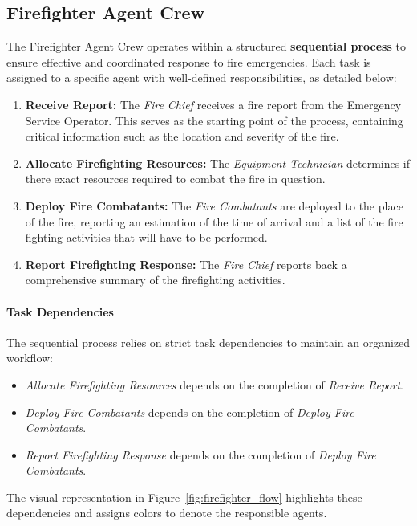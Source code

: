 \subsection{Firefighter Agent Crew}

The Firefighter Agent Crew operates within a structured \textbf{sequential process} to ensure effective and coordinated response to fire emergencies. Each task is assigned to a specific agent with well-defined responsibilities, as detailed below:

\begin{enumerate}
    \item \textbf{Receive Report:} The \textit{Fire Chief} receives a fire report from the Emergency Service Operator. This serves as the starting point of the process, containing critical information such as the location and severity of the fire.
    \item \textbf{Allocate Firefighting Resources:} The \textit{Equipment Technician} determines if there exact resources required to combat the fire in question.
	\item \textbf{Deploy Fire Combatants:} The \textit{Fire Combatants} are deployed to the place of the fire, reporting an estimation of the time of arrival and a list of the fire fighting activities that will have to be performed.
	\item \textbf{Report Firefighting Response:} The \textit{Fire Chief} reports back a comprehensive summary of the firefighting activities.
\end{enumerate}

\paragraph{Task Dependencies}
The sequential process relies on strict task dependencies to maintain an organized workflow:
\begin{itemize}
    \item \textit{Allocate Firefighting Resources} depends on the completion of \textit{Receive Report}.
    \item \textit{Deploy Fire Combatants} depends on the completion of \textit{Deploy Fire Combatants}.
    \item \textit{Report Firefighting Response} depends on the completion of \textit{Deploy Fire Combatants}.
\end{itemize}

The visual representation in Figure~\ref{fig:firefighter_flow} highlights these dependencies and assigns colors to denote the responsible agents.

